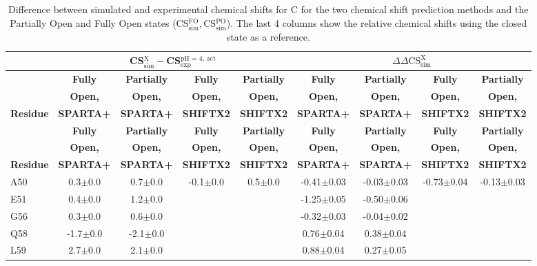 \documentclass[%
 aip,
 amsmath,amssymb,
 preprint,%
]{revtex4-1}
\begin{document}
\begingroup
\begin{center}
\begin{longtable}{l|c|c|c|c|c|c|c|c}
\caption{\scriptsize Difference between simulated and experimental chemical shifts for C for the two chemical shift prediction methods and the Partially Open and Fully Open states (CS$_\text{sim}^\text{FO}, $CS$_\text{sim}^\text{PO}$). The last 4 columns show the relative chemical shifts using the closed state as a reference.  \label{SI_tb_DDCS_C}}\\ 
\hline 
\hline 
\footnotesize
& \multicolumn{4}{c|}{ CS$_\text{sim}^\text{X}-$CS$_\text{exp}^\text{pH = 4, act}$} & \multicolumn{4}{c}{ $\Delta\Delta\text{CS}_\text{sim}^\text{X}$} \\
\hline
& \textbf{Fully} & \textbf{Partially} & \textbf{Fully} & \textbf{Partially} & \textbf{Fully} & \textbf{Partially} & \textbf{Fully} & \textbf{Partially} \\
& \textbf{Open,} & \textbf{Open,} & \textbf{Open,} & \textbf{Open,} & \textbf{Open,} & \textbf{Open,} & \textbf{Open,} & \textbf{Open,} \\
\textbf{Residue} & \textbf{SPARTA+} & \textbf{SPARTA+} & \textbf{SHIFTX2} & \textbf{SHIFTX2} & \textbf{SPARTA+} & \textbf{SPARTA+} & \textbf{SHIFTX2} & \textbf{SHIFTX2} \\
\hline
\endfirsthead 
\hline
& \textbf{Fully} & \textbf{Partially} & \textbf{Fully} & \textbf{Partially} & \textbf{Fully} & \textbf{Partially} & \textbf{Fully} & \textbf{Partially} \\
& \textbf{Open,} & \textbf{Open,} & \textbf{Open,} & \textbf{Open,} & \textbf{Open,} & \textbf{Open,} & \textbf{Open,} & \textbf{Open,} \\
\textbf{Residue} & \textbf{SPARTA+} & \textbf{SPARTA+} & \textbf{SHIFTX2} & \textbf{SHIFTX2} & \textbf{SPARTA+} & \textbf{SPARTA+} & \textbf{SHIFTX2} & \textbf{SHIFTX2} \\\hline
\endhead
A50 & 0.3$\pm$0.0 & 0.7$\pm$0.0 & -0.1$\pm$0.0 & 0.5$\pm$0.0 & -0.41$\pm$0.03 & -0.03$\pm$0.03 & -0.73$\pm$0.04 & -0.13$\pm$0.03 \\
E51 & 0.4$\pm$0.0 & 1.2$\pm$0.0 & & & -1.25$\pm$0.05 & -0.50$\pm$0.06 & & \\
G56 & 0.3$\pm$0.0 & 0.6$\pm$0.0 & & & -0.32$\pm$0.03 & -0.04$\pm$0.02 & & \\
Q58 & -1.7$\pm$0.0 & -2.1$\pm$0.0 & & & 0.76$\pm$0.04 & 0.38$\pm$0.04 & & \\
L59 & 2.7$\pm$0.0 & 2.1$\pm$0.0 & & & 0.88$\pm$0.04 & 0.27$\pm$0.05 & & \\

\end{longtable}
\end{center}
\end{document}
